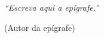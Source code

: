 \begin{epigrafe}
  \vspace*{\fill}
  \begin{flushright}
    \textit{``Escreva aqui a epígrafe.''}

    (Autor da epígrafe)
  \end{flushright}
\end{epigrafe}
